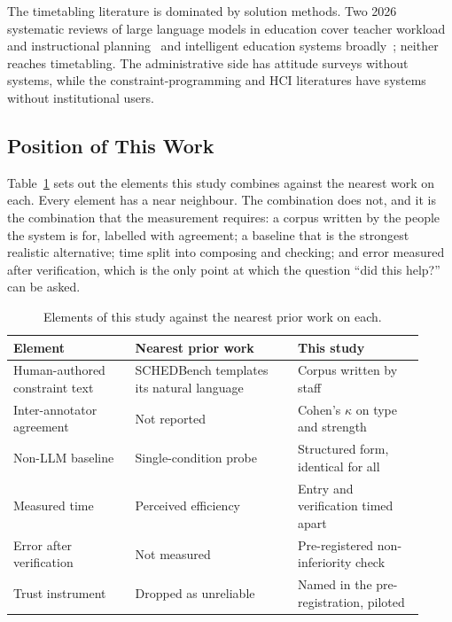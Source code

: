 \documentclass[acmsmall,screen,review,anonymous]{acmart}
\begin{document}
The timetabling literature is dominated by solution methods. Two 2026
systematic reviews of large language models in education cover teacher
workload and instructional planning~\cite{feduc2026review} and intelligent
education systems broadly~\cite{info2026review}; neither reaches timetabling.
The administrative side has attitude surveys without systems, while the
constraint-programming and HCI literatures have systems without institutional
users.

\subsection{Position of This Work}

Table~\ref{tab:position} sets out the elements this study combines against the
nearest work on each. Every element has a near neighbour. The combination does
not, and it is the combination that the measurement requires: a corpus written
by the people the system is for, labelled with agreement; a baseline that is
the strongest realistic alternative; time split into composing and checking;
and error measured after verification, which is the only point at which the
question ``did this help?'' can be asked.

\begin{table}[t]
  \caption{Elements of this study against the nearest prior work on each.}
  \label{tab:position}
  \small
  \begin{tabular}{@{}p{0.27\linewidth}p{0.36\linewidth}p{0.29\linewidth}@{}}
    \toprule
    \textbf{Element} & \textbf{Nearest prior work} & \textbf{This study} \\
    \midrule
    Human-authored constraint text
      & SCHEDBench templates its natural language~\cite{sharma2026schedbench}
      & Corpus written by staff \\
    Inter-annotator agreement
      & Not reported~\cite{lawless2024meetmate,sharma2026schedbench}
      & Cohen's $\kappa$ on type and strength~\cite{cohen1960kappa} \\
    Non-LLM baseline
      & Single-condition probe~\cite{lawless2024meetmate}
      & Structured form, identical for all \\
    Measured time
      & Perceived efficiency~\cite{lee2025veriplan}
      & Entry and verification timed apart \\
    Error after verification
      & Not measured
      & Pre-registered non-inferiority check \\
    Trust instrument
      & Dropped as unreliable~\cite{ipeirotis2026nlidb}
      & Named in the pre-registration, piloted \\
    \bottomrule
  \end{tabular}
\end{table}
\end{document}
